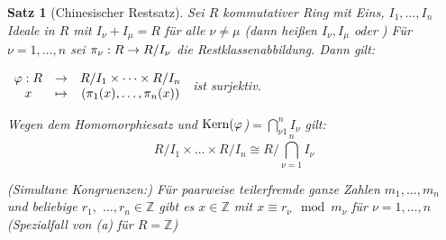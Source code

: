 \documentclass[a4paper,10pt,german]{scrbook}
\theoremstyle{saetze}
\newtheorem{Satz}{Satz}
\theoremstyle{definitionen}
\begin{document}
\begin{Satz}[Chinesischer Restsatz]
\label{Satz 8}
Sei $R$ kommutativer Ring mit Eins, $I_1,\dots,I_n$
Ideale in $R$ mit $I_\nu + I_\mu = R$ für alle $\nu \not= \mu$ (dann
heißen $I_\nu, I_\mu$  oder ) Für $\nu
= 1,\dots,n$ sei $\pi_\nu : R \rightarrow R/I_\nu$ die Restklassenabbildung.
Dann gilt:
\begin{enum}
\item $\begin{array}{ccc}\varphi: R &\rightarrow& R/I_1 \times \dots \times R/I_n \\
x &\mapsto& (\pi_1(x),\dots,\pi_n(x)) \end{array}$ ist surjektiv.

\item Wegen dem Homomorphiesatz und $\mathop{\rm Kern}\nolimits(\varphi$)$= \bigcap_{\nu1}^n I_\nu$ gilt:
\[R/I_1 \times \dots \times R/I_n \cong R/\bigcap_{\nu=1}^n
I_\nu\]
\item (Simultane Kongruenzen:) \newline Für paarweise teilerfremde ganze
Zahlen $m_1,\dots,m_n$ und beliebige $r_1,$ $\dots,r_n \in
\mathbb{Z}$ gibt es $x \in \mathbb{Z}$ mit $x \equiv r_\nu \mod
m_\nu$ für $\nu = 1,\dots,n$ (Spezialfall von (a) für
$R=\mathbb{Z}$) \end{enum}
\end{Satz}
\end{document}
